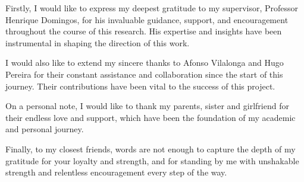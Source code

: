 
%

\begin{ntacknowledgements}

Firstly, I would like to express my deepest gratitude to my supervisor, Professor Henrique Domingos, for his invaluable guidance, support, and encouragement throughout the course of this research. His expertise and insights have been instrumental in shaping the direction of this work.

I would also like to extend my sincere thanks to Afonso Vilalonga and Hugo Pereira for their constant assistance and collaboration since the start of this journey. Their contributions have been vital to the success of this project.

On a personal note, I would like to thank my parents, sister and girlfriend for their endless love and support, which have been the foundation of my academic and personal journey.

Finally, to my closest friends, words are not enough to capture the depth of my gratitude for your loyalty and strength, and for standing by me with unshakable strength and relentless encouragement every step of the way.



\end{ntacknowledgements}